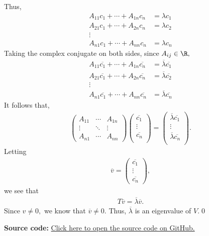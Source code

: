 \documentclass{amsart}
\newcommand{\pagenum}{140}
\newcommand{\probnum}{16}
\begin{document}
Thus,
\begin{align*}
    A_{11}c_1+\cdots+A_{1n}c_n&=\lambda c_1\\
    A_{21}c_1+\cdots+A_{2n}c_n&=\lambda c_2\\
    \vdots\\
    A_{n1}c_1+\cdots+A_{nn}c_n&=\lambda c_n
\end{align*}
Taking the complex conjugate on both sides, since $A_{ij}\in\R,$
\begin{align*}
    A_{11}\overline{c_1}+\cdots+A_{1n}\overline{c_n}&=\overline{\lambda}\overline{c_1}\\
    A_{21}\overline{c_1}+\cdots+A_{2n}\overline{c_n}&=\overline{\lambda}\overline{c_2}\\
    \vdots\\
    A_{n1}\overline{c_1}+\cdots+A_{nn}\overline{c_n}&=\overline{\lambda}\overline{c_n}
\end{align*}
It follows that,
\begin{align*}
    \begin{pmatrix}
        A_{11} & \cdots & A_{1n} \\
        \vdots & \ddots &\vdots \\
        A_{n1}    &\cdots & A_{nn}
    \end{pmatrix}
    \begin{pmatrix}
        \overline{c_1}\\
        \vdots\\
        \overline{c_n}\\
    \end{pmatrix}
    =\begin{pmatrix}
        \overline{\lambda}\overline{c_1}\\
        \vdots\\
        \overline{\lambda}\overline{c_n}\\
    \end{pmatrix}.
\end{align*}
Letting
\begin{align*}
    \overline v = \begin{pmatrix}
        \overline{c_1}\\
        \vdots\\
        \overline{c_n}
    \end{pmatrix},
\end{align*}
we see that
\begin{align*}
    T\overline v=\overline\lambda\overline v.
\end{align*}
Since $v\ne0,$ we know that $\overline v\ne 0.$ Thus, $\overline\lambda$
is an eigenvalue of $V$.\qed

\vspace{0.5in}

\textbf{Source code:} \href{https://github.com/thomasbreydo/linalg/blob/main/\pagenum_\probnum_Thomas_Breydo.tex}
{Click here to open the source code on GitHub.}
\end{document}
